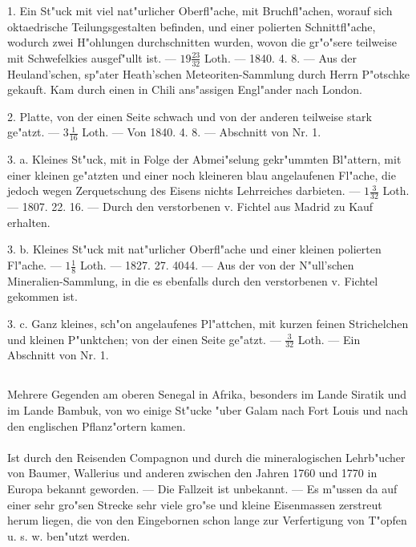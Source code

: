 \documentclass[a4paper, 11pt, oneside, polutonikogreek, german]{article}
\begin{document}
1. Ein St"uck mit viel nat"urlicher Oberfl"ache, mit Bruchfl"achen, worauf sich oktaedrische Teilungsgestalten befinden, und einer polierten Schnittfl"ache, wodurch zwei H"ohlungen durchschnitten wurden, wovon die gr"o"sere teilweise mit Schwefelkies ausgef"ullt ist. --- $\mathfrak{19\frac{23}{32}}$ Loth. --- 1840. 4. 8. --- Aus der Heuland'schen, sp"ater Heath'schen Meteoriten-Sammlung durch Herrn P"otschke gekauft. Kam durch einen in Chili ans"assigen Engl"ander nach London.

2. Platte, von der einen Seite schwach und von der anderen teilweise stark ge"atzt. --- $\mathfrak{3\frac{1}{16}}$ Loth. --- Von 1840. 4. 8. --- Abschnitt von Nr. 1.

3. a. Kleines St"uck, mit in Folge der Abmei"selung gekr"ummten Bl"attern, mit einer kleinen ge"atzten und einer noch kleineren blau angelaufenen Fl"ache, die jedoch wegen Zerquetschung des Eisens nichts Lehrreiches darbieten. --- $\mathfrak{1\frac{3}{32}}$ Loth. --- 1807. 22. 16. --- Durch den verstorbenen v. Fichtel aus Madrid zu Kauf erhalten.

3. b. Kleines St"uck mit nat"urlicher Oberfl"ache und einer kleinen polierten Fl"ache. --- $\mathfrak{1\frac{1}{8}}$ Loth. --- 1827. 27. 4044. --- Aus der von der N"ull'schen Mineralien-Sammlung, in die es ebenfalls durch den verstorbenen v. Fichtel gekommen ist.

3. c. Ganz kleines, sch"on angelaufenes Pl"attchen, mit kurzen feinen Strichelchen und kleinen P"unktchen; von der einen Seite ge"atzt. --- $\mathfrak{\frac{3}{32}}$ Loth. --- Ein Abschnitt von Nr. 1.
\subsection{}
\begin{center}

Mehrere Gegenden am oberen Senegal in Afrika, besonders im Lande Siratik und im Lande Bambuk, von wo einige St"ucke "uber Galam nach Fort Louis und nach den englischen Pflanz"ortern kamen.
\end{center}
\paragraph{}
Ist durch den Reisenden Compagnon und durch die mineralogischen Lehrb"ucher von Baumer, Wallerius und anderen zwischen den Jahren 1760 und 1770 in Europa bekannt geworden. --- Die Fallzeit ist unbekannt. --- Es m"ussen da auf einer sehr gro"sen Strecke sehr viele gro"se und kleine Eisenmassen zerstreut herum liegen, die von den Eingebornen schon lange zur Verfertigung von T"opfen u. s. w. ben"utzt werden.
\end{document}
